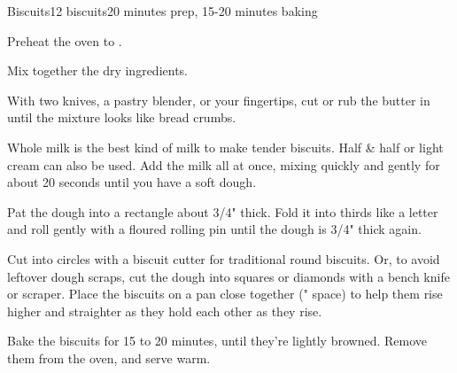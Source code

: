 \documentclass[../Cookbook.tex]{subfiles}
\begin{document}
\begin{recipe}[Biscuits]{Biscuits}{12 biscuits}{20 minutes prep, 15-20 minutes baking}

Preheat the oven to .


Mix together the dry ingredients.

With two knives, a pastry blender, or your fingertips, cut or rub the butter in until the mixture looks like bread crumbs.

Whole milk is the best kind of milk to make tender biscuits. Half \& half or light cream can also be used.
Add the milk all at once, mixing quickly and gently for about 20 seconds until you have a soft dough.

Pat the dough into a rectangle about 3/4" thick. Fold it into thirds like a letter and roll gently with a floured rolling pin until the dough is 3/4" thick again.

Cut into circles with a biscuit cutter for traditional round biscuits. Or, to avoid leftover dough scraps, cut the dough into squares or diamonds with a bench knife or scraper.
Place the biscuits on a pan close together (" space) to help them rise higher and straighter as they hold each other as they rise.

Bake the biscuits for 15 to 20 minutes, until they're lightly browned. Remove them from the oven, and serve warm.


\end{recipe}
\end{document}
